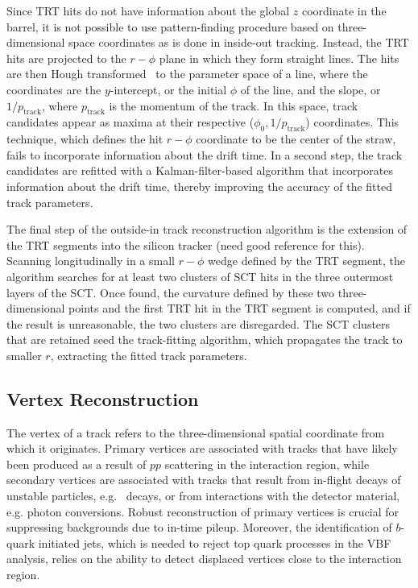 Since TRT hits do not have information about the global $z$
coordinate in the barrel, it is not possible to use pattern-finding
procedure based on three-dimensional space coordinates as is done in
inside-out tracking. Instead, the TRT hits are projected to the
$r-\phi$ plane in which they form straight lines. The hits are then Hough
transformed~\cite{bib:Duda:1972uht} to the parameter
space of a line, where the coordinates are the $y$-intercept, or the
initial $\phi$ of the line, and the slope, or $1/p_{\textrm{track}}$,
where $p_{\textrm{track}}$ is the momentum of the track. In this
space, track candidates appear as maxima at their respective
($\phi_0,1/p_{\textrm{track}}$) coordinates. This technique, which
defines the hit $r-\phi$ coordinate to be the center of the straw,
fails to incorporate information about the drift time. In a second
step, the track candidates are refitted with a Kalman-filter-based
algorithm that incorporates information about the drift time, thereby
improving the accuracy of the fitted track parameters. 

The final step of the outside-in track reconstruction algorithm is the
extension of the TRT segments into the silicon tracker (need good
reference for this). Scanning longitudinally in a small $r-\phi$ wedge
defined by the TRT segment, the algorithm searches for at least two
clusters of SCT hits in the three outermost layers of the
SCT. Once found, the curvature defined by these two three-dimensional
points and the first TRT hit in the TRT segment is computed, and if
the result is unreasonable, the two clusters are disregarded. The SCT
clusters that are retained seed the track-fitting algorithm, which
propagates the track to smaller $r$, extracting the fitted track
parameters. 

\subsection{Vertex Reconstruction}

The vertex of a track refers to the three-dimensional spatial
coordinate from which it originates. Primary vertices are associated
with tracks that have likely been produced as a result of $pp$
scattering in the interaction region, while secondary vertices are
associated with tracks that result from in-flight decays of unstable
particles, e.g. \kshort~decays, or from interactions with the detector
material, e.g. photon conversions. Robust reconstruction of primary
vertices is crucial for suppressing backgrounds due to in-time
pileup. Moreover, the identification of $b$-quark initiated jets,
which is needed to reject top quark processes in the VBF analysis,
relies on the ability to detect displaced vertices close to the
interaction region. 

